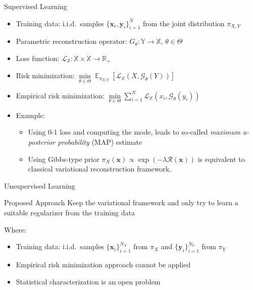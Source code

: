 \documentclass{beamer}
\DeclareMathOperator{\EX}{\mathbb{E}}%
\begin{document}
\begin{frame}{Supervised Learning}
\begin{itemize}
\item Training data: i.i.d.\ samples $\lbrace \pmb{x}_i, \pmb{y}_i \rbrace_{i=1}^{N}$ from the joint distribution $\pi_{X, Y}$
\item Parametric reconstruction operator: $G_{\theta}: \mathbb{Y} \rightarrow \mathbb{X}$, $\theta \in \Theta$
\item Loss function: $\mathcal{L}_{\mathbb{X}}: \mathbb{X} \times \mathbb{X} \rightarrow \mathbb{R}_{+}$
\item Risk minimization: $\min\limits_{\theta \in \Theta} \EX_{\pi_{X, Y}} \left[ \mathcal{L}_{\mathbb{X}}(X, \mathcal{G}_{\theta}(Y)) \right]$
\item Empirical risk minimization: $\min\limits_{\theta \in \Theta} \sum\limits_{i=1}^{N} \mathcal{L}_{\mathbb{X}}(x_i, \mathcal{G}_{\theta}(y_i))$
\item Example: 
\begin{itemize}
\item Using 0-1 loss and computing the mode, leads to so-called {\it maximum a-posterior probability} (MAP) estimate
\item Using Gibbs-type prior $\pi_{X}(\pmb{x}) \propto \exp{ \left(- \lambda \mathcal{R}(\pmb{x})\right)}$ is equivalent to classical variational reconstruction framework.
\end{itemize}
\end{itemize}
\end{frame}

\begin{frame}{Unsupervised Learning}
\begin{block}{Proposed Approach}
Keep the variational framework and only try to learn a suitable regularizer from the training data
\end{block}
Where:
\begin{itemize}
\item Training data: i.i.d.\ samples $\lbrace \pmb{x}_i \rbrace_{i = 1}^{N_{X}}$ from $\pi_{X}$ and $\lbrace \pmb{y}_i \rbrace_{i = 1}^{N_{Y}}$ from $\pi_{Y}$
\item Empirical risk minimization approach cannot be applied
\item Statistical characterization is an open problem
\end{itemize}
\end{frame}
\end{document}

